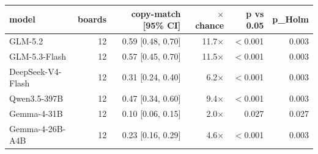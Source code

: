 \begin{tabular}{lrrrrr}
\toprule
\textbf{model} & \textbf{boards} & \textbf{copy-match [95\% CI]} & \textbf{$\times$ chance} & \textbf{p vs 0.05} & \textbf{p\_Holm} \\
\midrule
GLM-5.2 & 12 & 0.59 [0.48, 0.70] & 11.7$\times$ & $<$0.001 & 0.003 \\
GLM-5.3-Flash & 12 & 0.57 [0.45, 0.70] & 11.5$\times$ & $<$0.001 & 0.003 \\
DeepSeek-V4-Flash & 12 & 0.31 [0.24, 0.40] & 6.2$\times$ & $<$0.001 & 0.003 \\
Qwen3.5-397B & 12 & 0.47 [0.34, 0.60] & 9.4$\times$ & $<$0.001 & 0.003 \\
Gemma-4-31B & 12 & 0.10 [0.06, 0.15] & 2.0$\times$ & 0.027 & 0.027 \\
Gemma-4-26B-A4B & 12 & 0.23 [0.16, 0.29] & 4.6$\times$ & $<$0.001 & 0.003 \\
\bottomrule
\end{tabular}
